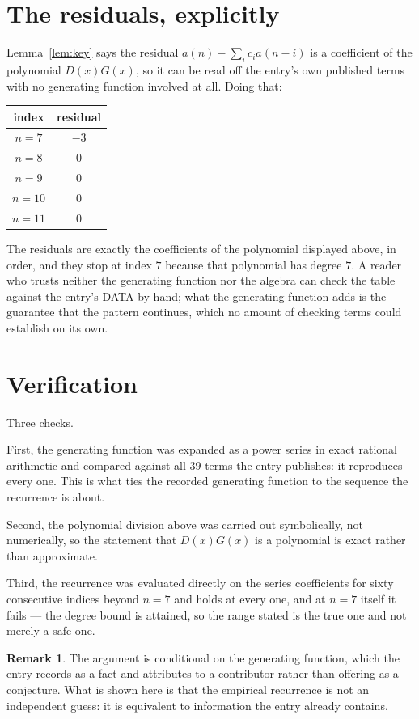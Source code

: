 \documentclass[11pt,a4paper]{article}
\theoremstyle{plain}
\theoremstyle{definition}
\newtheorem{remark}[theorem]{Remark}
\begin{document}
\section{The residuals, explicitly}

Lemma~\ref{lem:key} says the residual $a(n)-\sum_ic_ia(n-i)$ is a coefficient of the
polynomial $D(x)G(x)$, so it can be read off the entry's own published terms with no
generating function involved at all. Doing that:
\begin{center}
\begin{tabular}{cc}
index & residual \\ \hline
$n=7$ & $-3$ \\
$n=8$ & $0$ \\
$n=9$ & $0$ \\
$n=10$ & $0$ \\
$n=11$ & $0$
\end{tabular}
\end{center}
The residuals are exactly the coefficients of the polynomial displayed above, in order, and
they stop at index $7$ because that polynomial has degree $7$. A reader who trusts
neither the generating function nor the algebra can check the table against the entry's DATA
by hand; what the generating function adds is the guarantee that the pattern continues, which
no amount of checking terms could establish on its own.

\section{Verification}

Three checks.

First, the generating function was expanded as a power series in exact rational arithmetic and
compared against all $39$ terms the entry publishes: it reproduces every one. This is
what ties the recorded generating function to the sequence the recurrence is about.

Second, the polynomial division above was carried out symbolically, not numerically, so the
statement that $D(x)G(x)$ is a polynomial is exact rather than approximate.

Third, the recurrence was evaluated directly on the series coefficients for sixty consecutive
indices beyond $n=7$ and holds at every one, and at $n=7$ itself it fails --- the
degree bound is attained, so the range stated is the true one and not merely a safe one.

\begin{remark}
The argument is conditional on the generating function, which the entry records as a fact and
attributes to a contributor rather than offering as a conjecture. What is shown here is that
the empirical recurrence is not an independent guess: it is equivalent to information the
entry already contains.
\end{remark}
\end{document}
